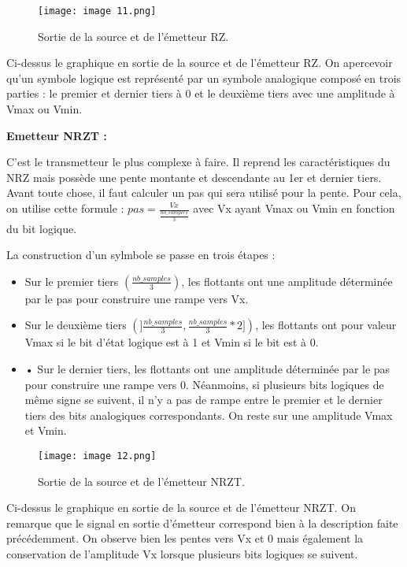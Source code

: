 \begin{figure}[h]
    \centering
    \texttt{[image: image 11.png]}
    \caption{\label{fig:image11}Sortie de la source et de l'émetteur RZ.}
\end{figure}

Ci-dessus le graphique en sortie de la source et de l'émetteur RZ. On apercevoir qu'un symbole logique est représenté par un symbole analogique composé en trois parties : le premier et dernier tiers à 0 et le deuxième tiers avec une amplitude à Vmax ou Vmin.

\textbf{Emetteur NRZT :}

C'est le transmetteur le plus complexe à faire. Il reprend les caractéristiques du NRZ mais possède une pente montante et descendante au 1er et dernier tiers. Avant toute chose, il faut calculer un pas qui sera utilisé pour la pente. Pour cela, on utilise cette formule : $ pas = \frac{Vx}{\frac{nb\_samples}{3}} $ avec Vx ayant Vmax ou Vmin en fonction du bit logique.

La construction d'un sylmbole se passe en trois étapes :
\begin{itemize}
    \item Sur le premier tiers $ \left(\frac{nb\_samples}{3} \right) $, les flottants ont une amplitude déterminée par le pas pour construire une rampe vers Vx.
    \item Sur le deuxième tiers $(]\frac{nb\_samples}{3}, \frac{nb\_samples}{3}*2]) $, les flottants ont pour valeur Vmax si le bit d'état logique est à 1 et Vmin si le bit est à 0.
    \item •	Sur le dernier tiers, les flottants ont une amplitude déterminée par le pas pour construire une rampe vers 0. Néanmoins, si plusieurs bits logiques de même signe se suivent, il n'y a pas de rampe entre le premier et le dernier tiers des bits analogiques correspondants. On reste sur une amplitude Vmax et Vmin.
\end{itemize}

\begin{figure}[h]
    \centering
    \texttt{[image: image 12.png]}
    \caption{\label{fig:image12}Sortie de la source et de l'émetteur NRZT.}
\end{figure}

Ci-dessus le graphique en sortie de la source et de l'émetteur NRZT. On remarque que le signal en sortie d'émetteur correspond bien à la description faite précédemment. On observe bien les pentes vers Vx et 0 mais également la conservation de l'amplitude Vx lorsque plusieurs bits logiques se suivent.


